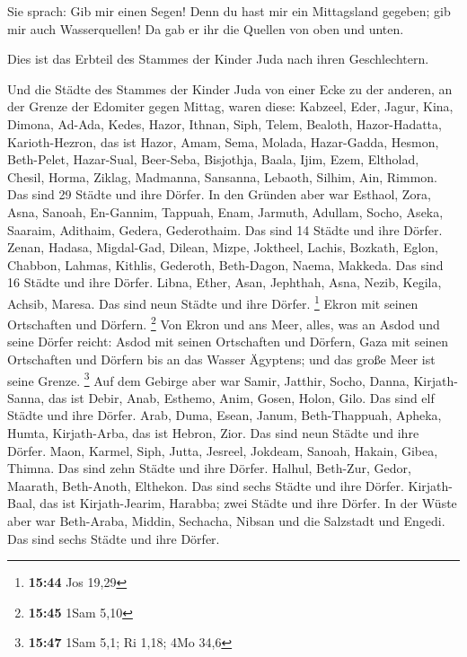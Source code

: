  Sie sprach: Gib mir einen Segen! Denn du hast mir ein
Mittagsland gegeben; gib mir auch Wasserquellen! Da gab er ihr die
Quellen von oben und unten.

 Dies ist das Erbteil des Stammes der Kinder Juda nach
ihren Geschlechtern.

 Und die Städte des Stammes der Kinder Juda von einer
Ecke zu der anderen, an der Grenze der Edomiter gegen Mittag, waren
diese: Kabzeel, Eder, Jagur,  Kina, Dimona, Ad-Ada,
 Kedes, Hazor, Ithnan,  Siph, Telem,
Bealoth,  Hazor-Hadatta, Karioth-Hezron, das ist Hazor,
 Amam, Sema, Molada,  Hazar-Gadda, Hesmon,
Beth-Pelet,  Hazar-Sual, Beer-Seba, Bisjothja,
 Baala, Ijim, Ezem,  Eltholad, Chesil,
Horma,  Ziklag, Madmanna, Sansanna, 
Lebaoth, Silhim, Ain, Rimmon. Das sind 29 Städte und ihre Dörfer.
 In den Gründen aber war Esthaol, Zora, Asna,
 Sanoah, En-Gannim, Tappuah, Enam, 
Jarmuth, Adullam, Socho, Aseka,  Saaraim, Adithaim,
Gedera, Gederothaim. Das sind 14 Städte und ihre Dörfer. 
Zenan, Hadasa, Migdal-Gad,  Dilean, Mizpe, Joktheel,
 Lachis, Bozkath, Eglon,  Chabbon, Lahmas,
Kithlis,  Gederoth, Beth-Dagon, Naema, Makkeda. Das sind
16 Städte und ihre Dörfer.  Libna, Ether, Asan,
 Jephthah, Asna, Nezib,  Kegila, Achsib,
Maresa. Das sind neun Städte und ihre Dörfer. \footnote{\textbf{15:44}
  Jos 19,29}  Ekron mit seinen Ortschaften und Dörfern.
\footnote{\textbf{15:45} 1Sam 5,10}  Von Ekron und ans
Meer, alles, was an Asdod und seine Dörfer reicht:  Asdod
mit seinen Ortschaften und Dörfern, Gaza mit seinen Ortschaften und
Dörfern bis an das Wasser Ägyptens; und das große Meer ist seine Grenze.
\footnote{\textbf{15:47} 1Sam 5,1; Ri 1,18; 4Mo 34,6} 
Auf dem Gebirge aber war Samir, Jatthir, Socho,  Danna,
Kirjath-Sanna, das ist Debir,  Anab, Esthemo, Anim,
 Gosen, Holon, Gilo. Das sind elf Städte und ihre Dörfer.
 Arab, Duma, Esean,  Janum, Beth-Thappuah,
Apheka,  Humta, Kirjath-Arba, das ist Hebron, Zior. Das
sind neun Städte und ihre Dörfer.  Maon, Karmel, Siph,
Jutta,  Jesreel, Jokdeam, Sanoah,  Hakain,
Gibea, Thimna. Das sind zehn Städte und ihre Dörfer. 
Halhul, Beth-Zur, Gedor,  Maarath, Beth-Anoth, Elthekon.
Das sind sechs Städte und ihre Dörfer.  Kirjath-Baal, das
ist Kirjath-Jearim, Harabba; zwei Städte und ihre Dörfer.
 In der Wüste aber war Beth-Araba, Middin, Sechacha,
 Nibsan und die Salzstadt und Engedi. Das sind sechs
Städte und ihre Dörfer.


